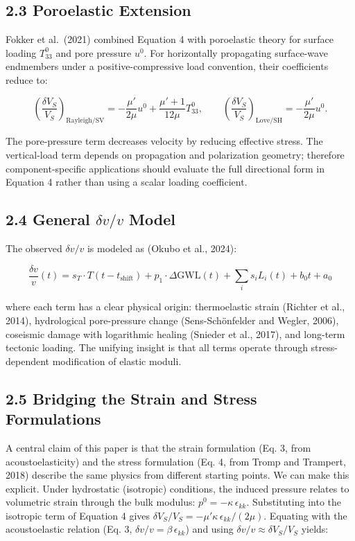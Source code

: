 \documentclass[12pt]{article}
\begin{document}
\subsection{2.3 Poroelastic Extension}\label{poroelastic-extension}

Fokker et al.~(2021) combined Equation 4 with poroelastic theory for
surface loading \(T_{33}^0\) and pore pressure \(u^0\). For horizontally
propagating surface-wave endmembers under a positive-compressive load
convention, their coefficients reduce to:

\[\left(\frac{\delta V_S}{V_S}\right)_{\mathrm{Rayleigh/SV}} = -\frac{\mu'}{2\mu}u^0 + \frac{\mu' + 1}{12\mu}T_{33}^0,\qquad
\left(\frac{\delta V_S}{V_S}\right)_{\mathrm{Love/SH}} = -\frac{\mu'}{2\mu}u^0 . \tag{5}\]

The pore-pressure term decreases velocity by reducing effective stress.
The vertical-load term depends on propagation and polarization geometry;
therefore component-specific applications should evaluate the full
directional form in Equation 4 rather than using a scalar loading
coefficient.

\subsection{\texorpdfstring{2.4 General \(\delta v/v\)
Model}{2.4 General \textbackslash delta v/v Model}}\label{general-delta-vv-model}

The observed \(\delta v/v\) is modeled as (Okubo et al., 2024):

\[\frac{\delta v}{v}(t) = s_T \cdot T(t - t_{\text{shift}}) + p_1 \cdot \Delta\text{GWL}(t) + \sum_i s_i L_i(t) + b_0 t + a_0 \tag{6}\]

where each term has a clear physical origin: thermoelastic strain
(Richter et al., 2014), hydrological pore-pressure change
(Sens-Schönfelder and Wegler, 2006), coseismic damage with logarithmic
healing (Snieder et al., 2017), and long-term tectonic loading. The
unifying insight is that all terms operate through stress-dependent
modification of elastic moduli.

\subsection{2.5 Bridging the Strain and Stress
Formulations}\label{bridging-the-strain-and-stress-formulations}

A central claim of this paper is that the strain formulation (Eq. 3,
from acoustoelasticity) and the stress formulation (Eq. 4, from Tromp
and Trampert, 2018) describe the same physics from different starting
points. We can make this explicit. Under hydrostatic (isotropic)
conditions, the induced pressure relates to volumetric strain through
the bulk modulus: \(p^0 = -\kappa \, \epsilon_{kk}\). Substituting into
the isotropic term of Equation 4 gives
\(\delta V_S/V_S = -\mu' \kappa \, \epsilon_{kk} / (2\mu)\). Equating
with the acoustoelastic relation (Eq. 3,
\(\delta v/v = \beta \, \epsilon_{kk}\)) and using
\(\delta v/v \approx \delta V_S/V_S\) yields:
\end{document}
